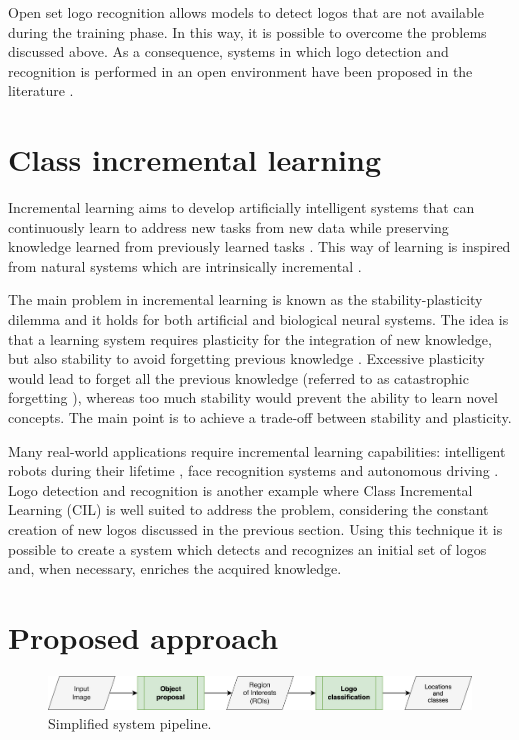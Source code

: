 Open set logo recognition allows models to
detect logos that are not available during the training phase. In this way, it is possible to overcome the problems discussed above. As a consequence, systems in which logo detection and recognition is performed in an open environment have been proposed in the literature \cite{fehervari2019scalable, li2022seetek}.

\section{Class incremental learning}
Incremental learning aims to develop artificially intelligent
systems that can continuously learn to address new tasks
from new data while preserving knowledge learned from
previously learned tasks \cite{masana2020class}. This way of learning is inspired from natural systems which are intrinsically incremental \cite{wu2019large}.

The main problem in incremental learning is known as the stability-plasticity dilemma and it holds for both artificial and biological neural systems. The idea is that a learning system requires plasticity for the integration of new knowledge, but also stability to avoid forgetting previous knowledge \cite{mermillod2013stability}. Excessive plasticity would lead to forget all the previous knowledge (referred to as catastrophic forgetting \cite{grossberg2013adaptive}), whereas too much stability would prevent the ability to learn novel concepts. The main point is to achieve a trade-off between stability and plasticity. 

Many real-world applications require incremental learning capabilities: intelligent robots during their lifetime \cite{thrun1995lifelong}, face recognition systems \cite{li2017incremental} and autonomous driving \cite{pierre2018incremental}. Logo detection and recognition is another example where Class Incremental Learning (CIL) is well suited to address the problem, considering the constant creation of new logos discussed in the previous section. Using this technique it is possible to create a system which detects and recognizes an initial set of logos and, when necessary, enriches the acquired knowledge.

\section{Proposed approach}

\begin{figure}
    \begin{center}
        \includegraphics[width=\columnwidth]{images/pipeline.drawio.png}
    \end{center}
    \caption{Simplified system pipeline.}
    \label{fig:system-pipeline}
\end{figure}


